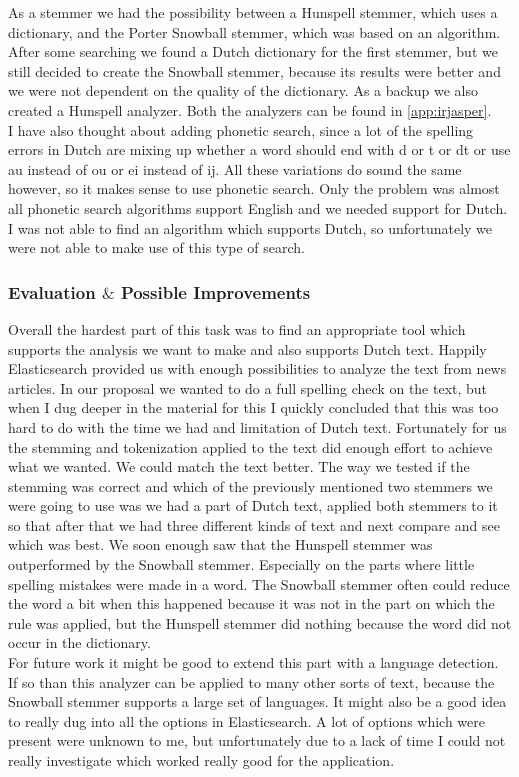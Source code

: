 As a stemmer we had the possibility between a Hunspell stemmer, which uses a dictionary, and the Porter Snowball stemmer, which was based on an algorithm. After some searching we found a Dutch dictionary for the first stemmer, but we still decided to create the Snowball stemmer, because its results were better and we were not dependent on the quality of the dictionary. As a backup we also created a Hunspell analyzer. Both the analyzers can be found in \autoref{app:irjasper}.\\
I have also thought about adding phonetic search, since a lot of the spelling errors in Dutch are mixing up whether a word should end with d or t or dt or use au instead of ou or ei instead of ij. All these variations do sound the same however, so it makes sense to use phonetic search. Only the problem was almost all phonetic search algorithms support English and we needed support for Dutch. I was not able to find an algorithm which supports Dutch, so unfortunately we were not able to make use of this type of search.

\subsubsection*{Evaluation $\&$ Possible Improvements }
Overall the hardest part of this task was to find an appropriate tool which supports the analysis we want to make and also supports Dutch text. Happily Elasticsearch provided us with enough possibilities to analyze the text from news articles. In our proposal we wanted to do a full spelling check on the text, but when I dug deeper in the material for this I quickly concluded that this was too hard to do with the time we had and limitation of Dutch text. Fortunately for us the stemming and tokenization applied to the text did enough effort to achieve what we wanted. We could match the text better. The way we tested if the stemming was correct and which of the previously mentioned two stemmers we were going to use was we had a part of Dutch text, applied both stemmers to it so that after that we had three different kinds of text and next compare and see which was best. We soon enough saw that the Hunspell stemmer was outperformed by the Snowball stemmer. Especially on the parts where little spelling mistakes were made in a word. The Snowball stemmer often could reduce the word a bit when this happened because it was not in the part on which the rule was applied, but the Hunspell stemmer did nothing because the word did not occur in the dictionary. \\
For future work it might be good to extend this part with a language detection. If so than this analyzer can be applied to many other sorts of text, because the Snowball stemmer supports a large set of languages. It might also be a good idea to really dug into all the options in Elasticsearch. A lot of options which were present were unknown to me, but unfortunately due to a lack of time I could not really investigate which worked really good for the application.

